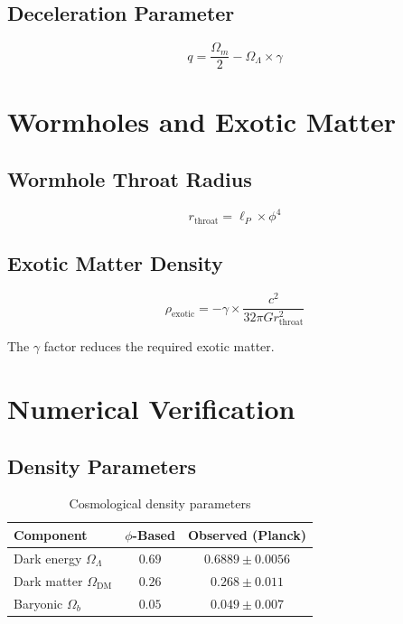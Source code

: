 \documentclass[12pt,a4paper]{article}
\begin{document}
\subsection{Deceleration Parameter}

\begin{equation}
q = \frac{\Omega_m}{2} - \Omega_\Lambda \times \gamma
\end{equation}

\section{Wormholes and Exotic Matter}

\subsection{Wormhole Throat Radius}

\begin{equation}
r_{\text{throat}} = \ell_P \times \phi^4
\end{equation}

\subsection{Exotic Matter Density}

\begin{equation}
\rho_{\text{exotic}} = -\gamma \times \frac{c^2}{32\pi G r_{\text{throat}}^2}
\end{equation}

The $\gamma$ factor reduces the required exotic matter.

\section{Numerical Verification}

\subsection{Density Parameters}

\begin{table}[h]
\centering
\begin{tabular}{lcc}
\toprule
Component & $\phi$-Based & Observed (Planck) \\
\midrule
Dark energy $\Omega_\Lambda$ & $0.69$ & $0.6889 \pm 0.0056$ \\
Dark matter $\Omega_{\text{DM}}$ & $0.26$ & $0.268 \pm 0.011$ \\
Baryonic $\Omega_b$ & $0.05$ & $0.049 \pm 0.007$ \\
\bottomrule
\end{tabular}
\caption{Cosmological density parameters}
\end{table}
\end{document}
